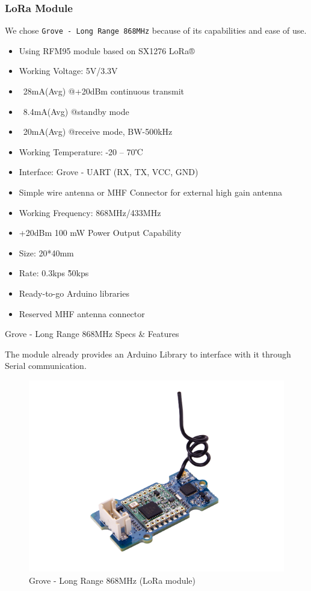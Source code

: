 \subsubsection{LoRa Module}
We chose \verb|Grove - Long Range 868MHz| because of its capabilities and ease of use.
 \begin{itemize}
    \item Using RFM95 module based on SX1276 LoRa®
    \item Working Voltage: 5V/3.3V
    \item ~28mA(Avg) @+20dBm continuous transmit
    \item ~8.4mA(Avg) @standby mode
    \item ~20mA(Avg) @receive mode, BW-500kHz
    \item Working Temperature: -20 – 70℃
    \item Interface: Grove - UART (RX, TX, VCC, GND)
    \item Simple wire antenna or MHF Connector for external high gain antenna
    \item Working Frequency: 868MHz/433MHz
    \item +20dBm 100 mW Power Output Capability
    \item Size: 20*40mm
    \item Rate: 0.3kps \~ 50kps
    \item Ready-to-go Arduino libraries
    \item Reserved MHF antenna connector
\end{itemize}
\begin{table}[H]
    \caption{Grove - Long Range 868MHz Specs \& Features}
\end{table}
The module already provides an Arduino Library to interface with it through Serial communication.
\begin{figure}[H]
    \centering
    \includegraphics[width=.6\textwidth]{images/node/grove_lora.png}
    \caption{Grove - Long Range 868MHz (LoRa module)}
\end{figure}


